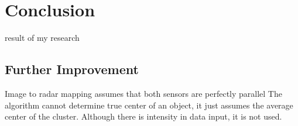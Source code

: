 
\chapter{Conclusion}\label{chap:conclusion}
result of my research

\section{Further Improvement}
Image to radar mapping assumes that both sensors are perfectly parallel
The algorithm cannot determine true center of an object, 
it just assumes the average center of the cluster.
Although there is intensity in data input, it is not used.